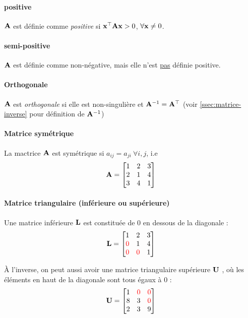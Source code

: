 \paragraph{positive} $\mathbf{A}$ est définie comme \textit{positive} si $\mathbf{x^{\top} A x} > 0$, $\forall \mathbf{x} \neq 0$.

\paragraph{semi-positive} $\mathbf{A}$ est définie comme non-négative, mais elle n'est \underline{pas} définie positive.

\paragraph{Orthogonale} $\mathbf{A}$ est \textit{orthogonale} si elle est non-singulière et $\mathbf{A}^{-1} = \mathbf{A}^{\top}$ (voir \autoref{ssec:matrice-inverse} pour définition de $\mathbf{A}^{-1}$)


\paragraph{Matrice symétrique} La mactrice $\mathbf{A}$ est symétrique si  $a_{ij} = a_{ji}  \ \forall i,j$, i.e
\begin{align*}
\mathbf{A} = 
\begin{bmatrix}
1     & 2    &  3   \\
2     & 1   & 4 \\
3   & 4   & 1 \\
\end{bmatrix}
\end{align*}

\paragraph{Matrice triangulaire (inférieure ou supérieure)} Une matrice inférieure $\mathbf{L}$ est constituée de 0 en dessous de la diagonale : 
\begin{align*}
\mathbf{L} = 
\begin{bmatrix}
1     & 2    &  3   \\
\textcolor{red}{0}     & 1   & 4 \\
\textcolor{red}{0}   & \textcolor{red}{0}   & 1 \\
\end{bmatrix}
\end{align*}

À l'inverse, on peut aussi avoir une matrice triangulaire supérieure $\mathbf{U}$ , où les éléments en haut de la diagonale sont tous égaux à 0 : 
\begin{align*}
\mathbf{U} = 
\begin{bmatrix}
1     & \textcolor{red}{0}    &  \textcolor{red}{0}   \\
8     & 3   & \textcolor{red}{0} \\
2   & 3   & 9 \\
\end{bmatrix}
\end{align*}

